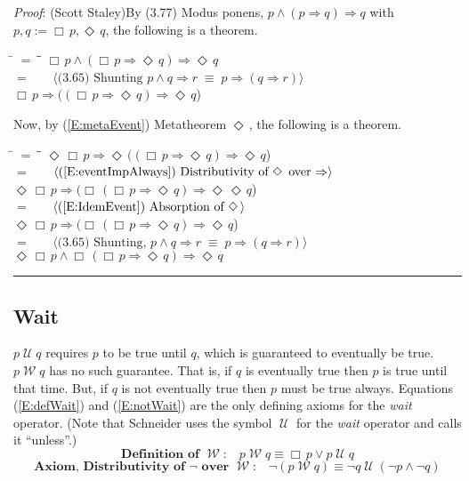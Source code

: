 \documentclass[12pt, fleqn, leqno]{article}
\newcommand{\lgap}{2pt}                             %
\newcommand{\mymathindent}{24pt}                    %
\newcommand{\equivs}{\ensuremath{\;\equiv\;}}       %
\newcommand{\impl}{\ensuremath{\Rightarrow}}        %
\newcommand{\Until}{\;\mathcal{U}\;}
\newcommand{\Wait}{\;\mathcal{W}\;}
\newcommand{\Event}{\Diamond\,}
\newcommand{\Always}{\Box\,}
\newcommand{\myqed}{\rule[-.23ex]{1.2ex}{2.0ex}}
\newcommand{\myqedtab}{\hspace{384pt}}              %
\newcommand{\Gll} {\langle}                         %
\newcommand{\Ggg} {\rangle}                         %
\newcommand{\Hint}[1]     {\ \ \ $\Gll              \mbox{#1} \Ggg$ }   %
\begin{document}
\emph{Proof}: (Scott Staley)\quad By (3.77) Modus ponens, $p\land (p\impl q)\impl q$ with $p,q:=\Always p,\Event q$, the following is a theorem.
\begin{tabbing}
\hspace{\mymathindent} \= $= \;$ \= \myqedtab \= \kill
\> \>   $\Always p\land (\Always p\impl \Event q)\impl \Event q$\\[\lgap]
\> $=$  \>  \Hint{(3.65) Shunting $p\land q\impl r\equivs p\impl (q\impl r)$}\\[\lgap]
\> \>   $\Always p\impl ((\Always p\impl \Event q)\impl \Event q$)
\end{tabbing}
Now, by (\ref{E:metaEvent}) Metatheorem $\Event$, the following is a theorem.
\begin{tabbing}
\hspace{\mymathindent} \= $= \;$ \= \myqedtab \= \kill
\> \>   $\Event\Always p\impl \Event((\Always p\impl \Event q)\impl \Event q$)\\[\lgap]
\> $=$  \>  \Hint{(\ref{E:eventImpAlways}) Distributivity of $\Event$ over $\impl$}\\[\lgap]
\> \>   $\Event\Always p\impl (\Always(\Always p\impl \Event q)\impl \Event\Event q$)\\[\lgap]
\> $=$  \>  \Hint{(\ref{E:IdemEvent}) Absorption of $\Event$}\\[\lgap]
\> \>   $\Event\Always p\impl (\Always(\Always p\impl \Event q)\impl \Event q$)\\[\lgap]
\> $=$  \>  \Hint{(3.65) Shunting, $p\land q\impl r\equivs p\impl (q\impl r)$}\\[\lgap]
\> \>   $\Event\Always p \land \Always(\Always p \impl \Event q) \impl \Event q$ \quad \myqed
\end{tabbing}

\subsection{Wait}\label{section-wait}

$p\Until q$ requires $p$ to be true until $q$, which is guaranteed to eventually be true.
$p\Wait q$ has no such guarantee.
That is, if $q$ is eventually true then $p$ is true until that time.
But, if $q$ is not eventually true then $p$ must be true always.
Equations (\ref{E:defWait}) and (\ref{E:notWait}) are the only defining axioms for the \textit{wait} operator.
(Note that Schneider \cite{Schn} uses the symbol $\Until$ for the \textit{wait} operator and calls it ``unless''.)
\begin{equation}\label{E:defWait}
\textbf{Definition of $\Wait$:}\quad p \Wait q \equiv \Always p \lor p \Until q 
\end{equation}
\begin{equation}\label{E:notWait}
\textbf{Axiom, Distributivity of $\neg$ over $\Wait$:}\quad \neg (p \Wait q) \equiv \neg q \Until (\neg p \land \neg q)
\end{equation}
\end{document}

